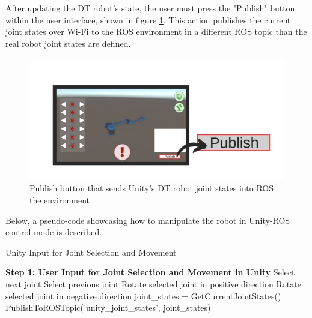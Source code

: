 \begin{itemize}
    After updating the \ac{DT} robot's state, the user must press the "Publish" button within the user interface, shown in figure \ref{fig:publish_UI_button}. This action publishes the current joint states over Wi-Fi to the ROS environment in a different \ac{ROS} topic than the real robot joint states are defined. 

    \begin{figure}[htpb]
        \centering
        \includegraphics[width=0.9\linewidth]{figs/publish.jpeg}
        \caption{Publish button that sends Unity's \ac{DT} robot joint states into ROS the environment}
        \label{fig:publish_UI_button}
    \end{figure}
    
    Below, a pseudo-code showcasing how to manipulate the robot in Unity-ROS control mode is described.
    \begin{algorithm}
        \caption{Unity Input for Joint Selection and Movement}\label{alg:unity_input}
        \begin{algorithmic}[1]
            \State \textbf{Step 1: User Input for Joint Selection and Movement in Unity}
                    \State Select next joint
                    \State Select previous joint
                \EndIf
                    \State Rotate selected joint in positive direction
                    \State Rotate selected joint in negative direction
                \EndIf
                    \State joint\_states = GetCurrentJointStates()
                    \State PublishToROSTopic('unity\_joint\_states', joint\_states)
                \EndIf
            \EndWhile
        \end{algorithmic}
    \end{algorithm}


\end{itemize}
